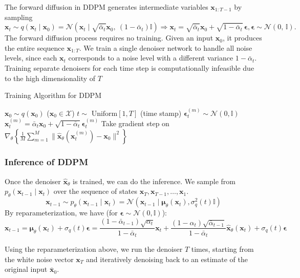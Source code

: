 \documentclass{article}
\newcommand{\x}{\mathbf{x}}
\newcommand{\N}{\mathcal{N}}
\begin{document}
	The forward diffusion in DDPM generates intermediate variables $\x_{1:T-1}$ by sampling $$ \x_t \sim q(\x_t \mid \x_0) = \N \left( \x_t \mid \sqrt{\bar{\alpha}_t} \x_0,\ (1 - \bar{\alpha}_t) \mathbb{I} \right) \Rightarrow \x_t = \sqrt{\bar{\alpha}_t} \x_0 + \sqrt{1 - \bar{\alpha}_t} \, \boldsymbol{\epsilon}, \boldsymbol{\epsilon} \sim \N (0,\, \mathbb{I}).$$
	The forward diffusion process requires no training. Given an input $\x_0$, it produces the entire sequence $\x_{1:T}$. We train a single denoiser network to handle all noise levels, since each $\x_t$ corresponds to a noise level with a different variance $1 - \bar{\alpha}_t$. Training separate denoisers for each time step is computationally infeasible due to the high dimensionality of $T$
	
	\begin{algorithm}
	\caption{Training Algorithm for DDPM}
	\begin{algorithmic}[1]
		\Repeat
			\State $\x_0 \sim q(\x_0)$ ($\x_0 \in \mathcal{X}$)
			\State $t \sim \text{ Uniform}[1, T]$ (time stamp)
			\State $\boldsymbol{\epsilon}_t^{(m)} \sim \N (0, \mathbb{I})$
			\State $\x_t^{(m)} = \bar{\alpha}_t \x_0 + \sqrt{1 - \bar{\alpha}_t} \boldsymbol{\epsilon}_t^{(m)}$
			\State Take gradient step on $\nabla_\theta \left\{ \frac{1}{M} \sum_{m=1}^M \lVert \hat{\x}_\theta (\x_t^{(m)}) - \x_0 \rVert^2 \right\}$
	\end{algorithmic}
	\end{algorithm}
	
	\subsubsection*{Inference of DDPM}
	
	Once the denoiser $\hat{\x}_\theta$ is trained, we can do the inference. We sample from $p_\theta (\x_{t-1} \mid \x_t)$ over the sequence of states $\x_T, \x_{T-1}, \dots, \x_1$. $$\x_{t-1} \sim p_\theta (\x_{t-1} \mid \x_t) = \N (\x_{t-1} \mid \boldsymbol{\mu}_\theta (\x_t), \sigma_q^2 (t) \mathbb{I})$$
	By reparameterization, we have (for $\boldsymbol{\epsilon} \sim \N(0, \mathbb{I})$): $$\x_{t-1} = \boldsymbol{\mu}_\theta (\x_t) + \sigma_q (t) \boldsymbol{\epsilon} = \frac{(1 - \bar{\alpha}_{t-1}) \sqrt{\alpha_t}}{1 - \bar{\alpha}_t} \x_t + \frac{(1 - \alpha_t) \sqrt{\bar{\alpha}_{t-1}}}{1 - \bar{\alpha}_t} \hat{\x}_\theta (\x_t) + \sigma_q (t) \boldsymbol{\epsilon}$$
	
	Using the reparameterization above, we run the denoiser $T$ times, starting from the white noise vector $\x_T$ and iteratively denoising back to an estimate of the original input $\bar{\x}_0$.
	
\end{document}
